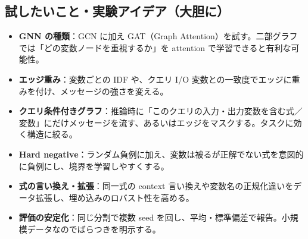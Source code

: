 \documentclass[11pt,a4paper]{jsarticle}
\begin{document}
\subsection{試したいこと・実験アイデア（大胆に）}
\label{sec:ideas}
\begin{itemize}[nosep]
  \item \textbf{GNN の種類}：GCN に加え GAT（Graph Attention）を試す。二部グラフでは「どの変数ノードを重視するか」を attention で学習できると有利な可能性。
  \item \textbf{エッジ重み}：変数ごとの IDF や、クエリ I/O 変数との一致度でエッジに重みを付け、メッセージの強さを変える。
  \item \textbf{クエリ条件付きグラフ}：推論時に「このクエリの入力・出力変数を含む式／変数」にだけメッセージを流す、あるいはエッジをマスクする。タスクに効く構造に絞る。
  \item \textbf{Hard negative}：ランダム負例に加え、変数は被るが正解でない式を意図的に負例にし、境界を学習しやすくする。
  \item \textbf{式の言い換え・拡張}：同一式の context 言い換えや変数名の正規化違いをデータ拡張し、埋め込みのロバスト性を高める。
  \item \textbf{評価の安定化}：同じ分割で複数 seed を回し、平均・標準偏差で報告。小規模データなのでばらつきを明示する。
\end{itemize}

\end{document}
